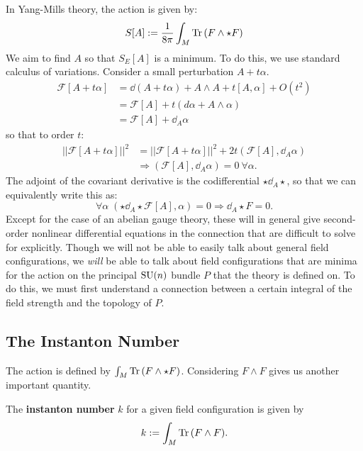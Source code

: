 In Yang-Mills theory, the action is given by:
\begin{equation}
	S[A] := \frac{1}{8\pi} \int_M \mathrm{Tr}\,(F \wedge \star F)
\end{equation}
We aim to find $A$ so that $S_E[A]$ is a minimum. To do this, we use standard calculus of variations. Consider a small perturbation $A + t \alpha$.
		\begin{equation*}
			\begin{aligned}
				\mathcal F[A + t \alpha] &= \dd (A + t \alpha) + A \wedge A + t [A, \alpha] + O(t^2) \\
				&= \mathcal F[A] + t (d \alpha + A \wedge \alpha)\\
				&= \mathcal F[A] + \dd_{A} \alpha
			\end{aligned}
		\end{equation*}
		so that to order $t$:
		\begin{equation*}
			\begin{aligned}
				||\mathcal F[A + t \alpha]||^2 &= ||\mathcal F[A + t \alpha]||^2 + 2 t (\mathcal F[A], \dd_{A} \alpha)\\
				&\Rightarrow (\mathcal F[A], \dd_{A} \alpha) = 0 ~ \forall \alpha.
			\end{aligned}
		\end{equation*}
		The adjoint of the covariant derivative is the codifferential $\star \dd_A \star$, so that we can equivalently write this as:
		\[
			\forall \alpha \; (\star \dd_A \star \mathcal F[A], \alpha) = 0 \Rightarrow \dd_A \star F = 0.
		\]
		Except for the case of an abelian gauge theory, these will in general give second-order nonlinear differential equations in the connection that are difficult to solve for explicitly. Though we will not be able to easily talk about general field configurations, we \emph{will} be able to talk about field configurations that are minima for the action on the principal $\mathrm{SU}(n)$ bundle $P$ that the theory is defined on. To do this, we must first understand a connection between a certain integral of the field strength and the topology of $P$.


\subsection{The Instanton Number} %
\label{sub:the_instanton_number}

		The action is defined by $\int_M \mathrm{Tr}\,(F \wedge \star F)$. Considering $F \wedge F$ gives us another important quantity. 
		\begin{defn}
			The \textbf{instanton number} $k$ for a given field configuration is given by
			\begin{equation}
				k := \int_M \mathrm{Tr}\,(F \wedge F).
			\end{equation}
		\end{defn}

